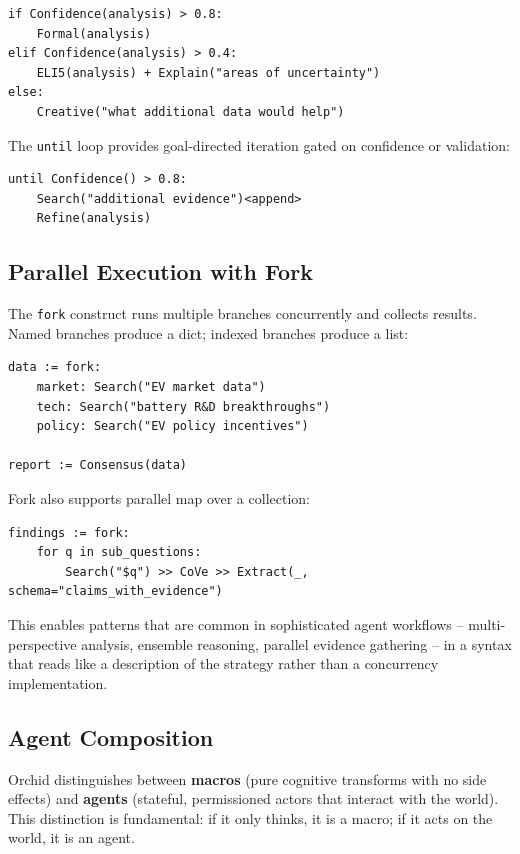 \documentclass[11pt,a4paper]{article}
\begin{document}
\begin{lstlisting}[language=orchid]
if Confidence(analysis) > 0.8:
    Formal(analysis)
elif Confidence(analysis) > 0.4:
    ELI5(analysis) + Explain("areas of uncertainty")
else:
    Creative("what additional data would help")
\end{lstlisting}

The \texttt{until} loop provides goal-directed iteration gated on confidence or validation:

\begin{lstlisting}[language=orchid]
until Confidence() > 0.8:
    Search("additional evidence")<append>
    Refine(analysis)
\end{lstlisting}

\subsection{Parallel Execution with Fork}

The \texttt{fork} construct runs multiple branches concurrently and collects results. Named branches produce a dict; indexed branches produce a list:

\begin{lstlisting}[language=orchid]
data := fork:
    market: Search("EV market data")
    tech: Search("battery R&D breakthroughs")
    policy: Search("EV policy incentives")

report := Consensus(data)
\end{lstlisting}

Fork also supports parallel map over a collection:

\begin{lstlisting}[language=orchid]
findings := fork:
    for q in sub_questions:
        Search("$q") >> CoVe >> Extract(_, schema="claims_with_evidence")
\end{lstlisting}

This enables patterns that are common in sophisticated agent workflows -- multi-perspective analysis, ensemble reasoning, parallel evidence gathering -- in a syntax that reads like a description of the strategy rather than a concurrency implementation.

\subsection{Agent Composition}

Orchid distinguishes between \textbf{macros} (pure cognitive transforms with no side effects) and \textbf{agents} (stateful, permissioned actors that interact with the world). This distinction is fundamental: if it only thinks, it is a macro; if it acts on the world, it is an agent.
\end{document}
